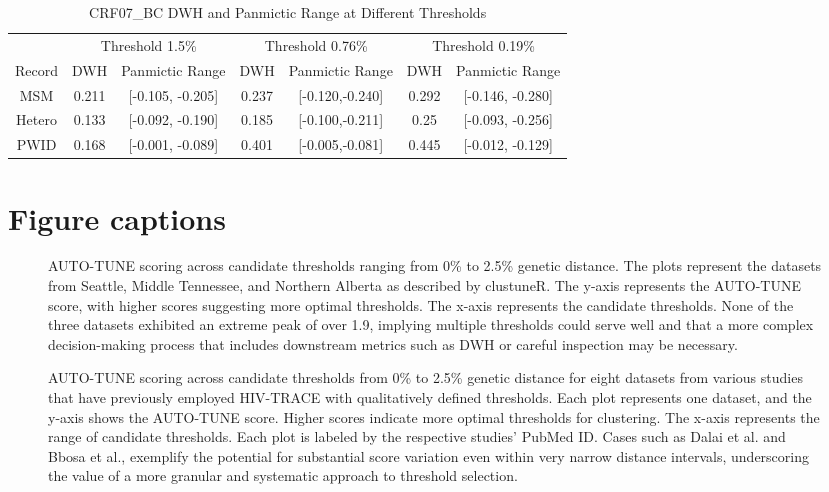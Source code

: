 \documentclass[utf8]{FrontiersinHarvard} %
\begin{document}
\begin{table}[h]
\caption{CRF07\_BC DWH and Panmictic Range at Different Thresholds}
\label{tab:combined}
\centering
\begin{tabular}{|c|c|c|c|c|c|c|}
\hline
& \multicolumn{2}{c|}{Threshold 1.5\%} & \multicolumn{2}{c|}{Threshold 0.76\%} & \multicolumn{2}{c|}{Threshold 0.19\%} \\
\cline{2-7}
Record & DWH & Panmictic Range & DWH & Panmictic Range & DWH & Panmictic Range \\
\hline
MSM & 0.211 & [-0.105, -0.205] & 0.237 & [-0.120,-0.240] & 0.292 & [-0.146, -0.280] \\
Hetero & 0.133 & [-0.092, -0.190] & 0.185 & [-0.100,-0.211] & 0.25 & [-0.093, -0.256] \\
PWID & 0.168 & [-0.001, -0.089] & 0.401 & [-0.005,-0.081] & 0.445 & [-0.012, -0.129] \\
\hline
\end{tabular}
\end{table}

\section{Figure captions}

\begin{figure}[h!]
\caption{ AUTO-TUNE scoring across candidate thresholds ranging from 0\% to
  2.5\% genetic distance. The plots represent the datasets from Seattle, Middle
  Tennessee, and Northern Alberta as described by clustuneR. The y-axis
  represents the AUTO-TUNE score, with higher scores suggesting more optimal
  thresholds. The x-axis represents the candidate thresholds. None of the three
  datasets exhibited an extreme peak of over 1.9, implying multiple thresholds
  could serve well and that a more complex decision-making process that
  includes downstream metrics such as DWH or careful inspection may be
  necessary.}\label{fig:clustuner}
\end{figure}

\begin{figure}[h!]
\caption{ AUTO-TUNE scoring across candidate thresholds from 0\% to 2.5\%
  genetic distance for eight datasets from various studies that have previously
  employed HIV-TRACE with qualitatively defined thresholds. Each plot
  represents one dataset, and the y-axis shows the AUTO-TUNE score. Higher
  scores indicate more optimal thresholds for clustering. The x-axis represents
  the range of candidate thresholds. Each plot is labeled by the respective
  studies' PubMed ID. Cases such as Dalai et al. and Bbosa et al., exemplify
the potential for substantial score variation even within very narrow distance
intervals, underscoring the value of a more granular and systematic approach to
threshold selection. }\label{fig:paperComparison} \end{figure}
\end{document}
